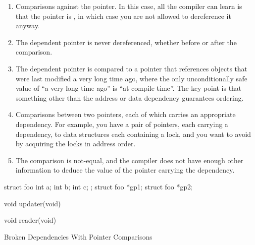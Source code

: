 \begin{enumerate}
\item	Comparisons against the  pointer.
	In this case, all the compiler can learn is that the pointer
	is , in which case you are not allowed to
	dereference it anyway.
\item	The dependent pointer is never dereferenced, whether before or
	after the comparison.
\item	The dependent pointer is compared to a pointer that references
	objects that were last modified a very long time ago, where
	the only unconditionally safe value of ``a very long time ago'' is
	``at compile time''.
	The key point is that something other than the address or data
	dependency guarantees ordering.
\item	Comparisons between two pointers, each of which carries
	an appropriate dependency.
	For example, you have a pair of pointers, each carrying a
	dependency, to data structures each containing a lock, and you
	want to avoid  by acquiring the locks in address order.
\item	The comparison is not-equal, and the compiler does not have
	enough other information to deduce the value of the
	pointer carrying the dependency.
\end{enumerate}

\begin{listing}
\begin{fcvlabel}
\begin{VerbatimL}[commandchars=\\\[\]]
struct foo {		\lnlbl[foo:b]
	int a;
	int b;
	int c;
};                      \lnlbl[foo:e]
struct foo *gp1;	\lnlbl[gp1]
struct foo *gp2;	\lnlbl[gp2]

void updater(void)						\lnlbl[upd:e]

void reader(void)						\lnlbl[read:e]
\end{VerbatimL}
\end{fcvlabel}
\caption{Broken Dependencies With Pointer Comparisons}
\label{lst:memorder:Broken Dependencies With Pointer Comparisons}
\end{listing}

